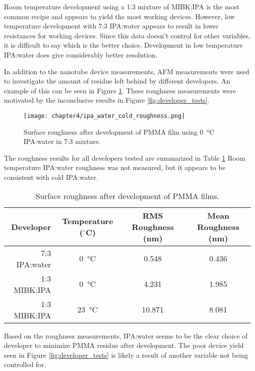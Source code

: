 Room temperature development using a 1:3 mixture of MIBK:IPA is the most common recipe and appears to yield the most working devices. However, low temperature development with 7:3 IPA:water appears to result in lower resistances for working devices. Since this data doesn't control for other variables, it is difficult to say which is the better choice. Development in low temperature IPA:water does give considerably better resolution. 

In addition to the nanotube device measurements, AFM measurements were used to investigate the amount of residue left behind by different developers. An example of this can be seen in Figure \ref{fig:roughness}. These roughness measurements were motivated by the inconclusive results in Figure \ref{fig:developer_tests}.

\begin{figure}
    \centering
    \texttt{[image: chapter4/ipa\_water\_cold\_roughness.png]}
    \caption{Surface roughness after development of PMMA film using \SI{0}{\celsius} IPA:water in 7:3 mixture.}
    \label{fig:roughness}
\end{figure}

The roughness results for all developers tested are summarized in Table \ref{table:surface_roughness} Room temperature IPA:water roughness was not measured, but it appears to be consistent with cold IPA:water. 

\begin{table}
    \centering
    \caption{Surface roughness after development of PMMA films.}
    \begin{tabular}{ r | c c c}
        Developer & Temperature ($^{\circ}$C) & RMS Roughness (nm) & Mean Roughness (nm) \\ \hline
    7:3 IPA:water & \SI{0}{\celsius} & 0.548 & 0.436 \\
    1:3 MIBK:IPA & \SI{0}{\celsius} & 4.231 & 1.985 \\
    1:3 MIBK:IPA & \SI{23}{\celsius} & 10.871 & 8.081 \\
    \end{tabular}
    \label{table:surface_roughness}  
\end{table}

Based on the roughness measurements, IPA:water seems to be the clear choice of developer to minimize PMMA residue after development. The poor device yield seen in Figure \ref{fig:developer_tests} is likely a result of another variable not being controlled for.

